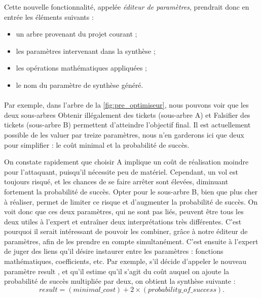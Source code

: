			Cette nouvelle fonctionnalité, appelée \emph{éditeur de paramètres}, prendrait donc en entrée les éléments suivants :
			\begin{itemize}
				\item un arbre provenant du projet courant ;
				\item les paramètres intervenant dans la synthèse ;
				\item les opérations mathématiques appliquées ;
				\item le nom du paramètre de synthèse généré.
			\end{itemize}

			\paragraph{}
			Par exemple, dans l'arbre de la {} \ref{fig:pre_optimiseur}, nous pouvons voir que les deux sous-arbres \og Obtenir illégalement des tickets \fg{} (sous-arbre A) et \og Falsifier des tickets \fg{} (sous-arbre B) permettent d'atteindre l'objectif final. Il est actuellement possible de les valuer par treize paramètres, nous n'en garderons ici que deux pour simplifier : le coût minimal et la probabilité de succès.

			On constate rapidement que choisir A implique un coût de réalisation moindre pour l'attaquant, puisqu'il nécessite peu de matériel. Cependant, un vol est toujours risqué, et les chances de se faire arrêter sont élevées, diminuant fortement la probabilité de succès. Opter pour le sous-arbre B, bien que plus cher à réaliser, permet de limiter ce risque et d'augmenter la probabilité de succès. On voit donc que ces deux paramètres, qui ne sont pas liés, peuvent être tous les deux utiles à l'expert et entraîner deux interprétations très différentes. C'est pourquoi il serait intéressant de pouvoir les combiner, grâce à notre éditeur de paramètres, afin de les prendre en compte simultanément. C'est ensuite à l'expert de juger des liens qu'il désire instaurer entre les paramètres : fonctions mathématiques, coefficients, etc. Par exemple, s'il décide d'appeler le nouveau paramètre \og result \fg{}, et qu'il estime qu'il s'agit du coût auquel on ajoute la probabilité de succès multipliée par deux, on obtient la synthèse suivante : \[ result = (minimal\_cost) + 2 \times (probability\_of\_success).\]
